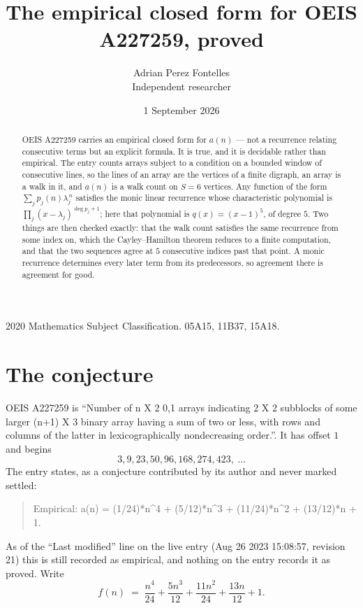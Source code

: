 \documentclass[11pt,a4paper]{article}
\title{The empirical closed form for OEIS A227259, proved}
\author{Adrian Perez Fontelles\\ \small Independent researcher}
\date{1 September 2026}
\theoremstyle{plain}
\theoremstyle{definition}
\begin{document}
\maketitle

\begin{abstract}
OEIS A227259 carries an empirical closed form for $a(n)$ --- not a recurrence relating
consecutive terms but an explicit formula. It is true, and it is decidable rather than
empirical. The entry counts arrays subject to a condition on a bounded window of consecutive lines, so the lines of an array are the
vertices of a finite digraph, an array is a walk in it, and $a(n)$ is a walk count on
$S=6$ vertices. Any function of the form $\sum_j p_j(n)\lambda_j^{\,n}$ satisfies the
monic linear recurrence whose characteristic polynomial is
$\prod_j(x-\lambda_j)^{\deg p_j+1}$; here that polynomial is $q(x)=(x-1)^{5}$, of degree
$5$. Two things are then checked exactly: that the walk count satisfies the same
recurrence from some index on, which the Cayley--Hamilton theorem reduces to a finite
computation, and that the two sequences agree at $5$ consecutive indices past that
point. A monic recurrence determines every later term from its predecessors, so agreement
there is agreement for good.
\end{abstract}

\noindent\small 2020 Mathematics Subject Classification. 05A15, 11B37, 15A18.\normalsize

\section{The conjecture}

OEIS A227259 is ``Number of n X 2 0,1 arrays indicating 2 X 2 subblocks of some larger (n+1) X 3 binary array having a sum of two or less, with rows and columns of the latter in lexicographically nondecreasing order.''. It has offset $1$ and begins
\[
3, 9, 23, 50, 96, 168, 274, 423,\ \dots
\]
The entry states, as a conjecture contributed by its author and never marked settled:
\begin{quote}
Empirical: a(n) = (1/24)*n\^{}4 + (5/12)*n\^{}3 + (11/24)*n\^{}2 + (13/12)*n + 1.
\end{quote}
As of the ``Last modified'' line on the live entry (Aug 26 2023 15:08:57, revision 21) this is still
recorded as empirical, and nothing on the entry records it as proved. Write
\[
f(n)\;=\;\frac{n^{4}}{24} + \frac{5 n^{3}}{12} + \frac{11 n^{2}}{24} + \frac{13 n}{12} + 1.
\]
\end{document}
